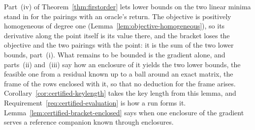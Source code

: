 
Part~(iv) of Theorem~\ref{thm:firstorder} lets lower bounds on the two linear
minima stand in for the pairings with an oracle's return. The objective is
positively homogeneous of degree one
(Lemma~\ref{lem:objective-homogeneous}), so its derivative along the point
itself is its value there, and the bracket loses the objective and the two
pairings with the point: it is the sum of the two lower bounds, part~(i).
What remains to be bounded is the gradient alone, and parts~(ii) and~(iii)
say how an enclosure of it yields the two lower bounds, the feasible one from
a residual known up to a ball around an exact matrix, the frame of the rows
enclosed with it, so that no deduction for the frame arises.
Corollary~\ref{cor:certified-keylength} takes the key length from this
lemma, and Requirement~\ref{req:certified-evaluation} is how a run forms
it. Lemma~\ref{lem:certified-bracket-enclosed} says when one enclosure of
the gradient serves a reference companion known through enclosures.

